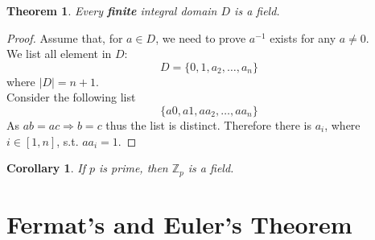 \documentclass{article}
\theoremstyle{MyNonumberplain}
\theoremstyle{break}
\newtheorem*{proof}{Proof. }
\theoremstyle{break}
\newtheorem{theorem}{Theorem}[section]
\newtheorem{corollary}{Corollary}[theorem]
\theoremstyle{break}
\theoremstyle{definition}
\theoremstyle{break}
\begin{document}
\begin{thmbox}
    \begin{theorem}
        Every \textbf{finite} integral domain $D$ is a field. 
    \end{theorem}
    \begin{prfbox}
        \begin{proof}
            Assume that, for $a \in D$, we need to prove $a^{- 1}$ exists for any $a \neq
            0$.\\
            
            We list all element in $D :$
            \[ D = \{ 0, 1, a_2, \ldots, a_n \} \]
            where $| D | = n + 1$.\\
            
            Consider the following list
            \[ \{ a 0, a 1, a a_2, \ldots, a a_n \} \]
            As $a b = a c \Rightarrow b = c$ thus the list is distinct. Therefore there is
            $a_i$, where $i \in [1, n]$, s.t. $a a_i = 1$.
        \end{proof}
    \end{prfbox}
\end{thmbox}

\begin{thmbox}
    \begin{corollary}
        If $p$ is prime, then $\mathbb{Z}_p$ is a field.
    \end{corollary}
\end{thmbox}

\newpage

\section{Fermat's and Euler's Theorem}
\end{document}
